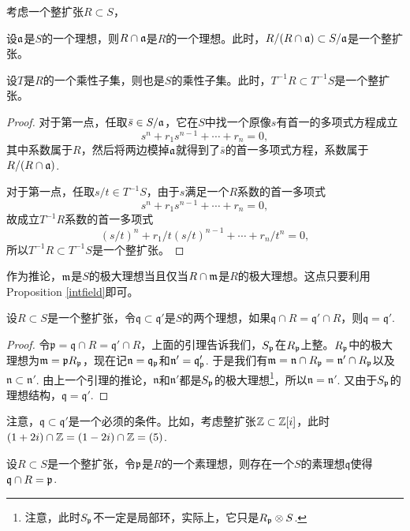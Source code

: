 \begin{lem}考虑一个整扩张$R\subset S$，
\begin{compactenum}[~~~(1)]
\item 设$\mathfrak{a}$是$S$的一个理想，则$R\cap \mathfrak{a}$是$R$的一个理想。此时，$R/(R\cap \mathfrak{a})\subset S/\mathfrak{a}$是一个整扩张。
\item 设$T$是$R$的一个乘性子集，则也是$S$的乘性子集。此时，$T^{-1}R\subset T^{-1}S$是一个整扩张。
\end{compactenum}
\end{lem}

\begin{proof}
对于第一点，任取$\bar{s}\in S/\mathfrak{a}$，它在$S$中找一个原像$s$有首一的多项式方程成立
\[
	s^n+r_1s^{n-1}+\cdots+r_n=0,
\]
其中系数属于$R$，然后将两边模掉$\mathfrak{a}$就得到了$\bar{s}$的首一多项式方程，系数属于$R/(R\cap \mathfrak{a})$.

对于第一点，任取$s/t\in T^{-1}S$，由于$s$满足一个$R$系数的首一多项式
\[
	s^n+r_1s^{n-1}+\cdots+r_n=0,
\]
故成立$T^{-1}R$系数的首一多项式
\[
	(s/t)^n+r_1/t (s/t)^{n-1}+\cdots+ r_n/t^n=0,
\]
所以$T^{-1}R\subset T^{-1}S$是一个整扩张。
\end{proof}

作为推论，$\mathfrak{m}$是$S$的极大理想当且仅当$R\cap \mathfrak{m}$是$R$的极大理想。这点只要利用Proposition \ref{intfield}即可。

\begin{pro}
设$R\subset S$是一个整扩张，令$\mathfrak{q}\subset \mathfrak{q'}$是$S$的两个理想，如果$\mathfrak{q}\cap R=\mathfrak{q}'\cap R$，则$\mathfrak{q}=\mathfrak{q}'$.
\end{pro}

\begin{proof}
令$\mathfrak{p}=\mathfrak{q}\cap R=\mathfrak{q}'\cap R$，上面的引理告诉我们，$S_{\mathfrak{p}}$在$R_{\mathfrak{p}}$上整。$R_{\mathfrak{p}}$中的极大理想为$\mathfrak{m}=\mathfrak{p} R_{\mathfrak{p}}$，现在记$\mathfrak{n}=\mathfrak{q}_{\mathfrak{p}}$和$\mathfrak{n}'=\mathfrak{q}'_{\mathfrak{p}}$. 于是我们有$\mathfrak{m}=\mathfrak{n}\cap R_{\mathfrak{p}}=\mathfrak{n}'\cap R_{\mathfrak{p}}$以及$\mathfrak{n}\subset \mathfrak{n}'$. 由上一个引理的推论，$\mathfrak{n}$和$\mathfrak{n}'$都是$S_{\mathfrak{p}}$的极大理想\footnote{注意，此时$S_{\mathfrak{p}}$不一定是局部环，实际上，它只是$R_{\mathfrak{p}}\otimes S$.}，所以$\mathfrak{n}=\mathfrak{n}'$. 又由于$S_{\mathfrak{p}}$的理想结构，$\mathfrak{q}=\mathfrak{q'}$.
\end{proof}

注意，$\mathfrak{q}\subset \mathfrak{q'}$是一个必须的条件。比如，考虑整扩张$\mathbb{Z}\subset \mathbb{Z}[i]$，此时$(1+2i)\cap \mathbb{Z}=(1-2i)\cap \mathbb{Z} =(5)$.

\begin{pro}
设$R\subset S$是一个整扩张，令$\mathfrak{p}$是$R$的一个素理想，则存在一个$S$的素理想$\mathfrak{q}$使得$\mathfrak{q}\cap R=\mathfrak{p}$.
\end{pro}


